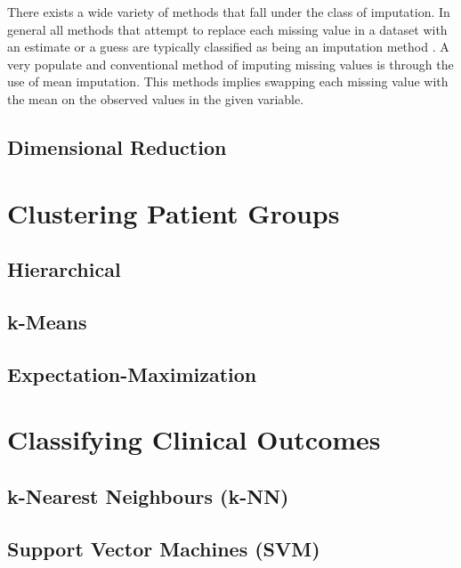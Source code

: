 \documentclass[../thesis.tex]{subfiles}
\begin{document}
\noindent There exists a wide variety of methods that fall under the class of imputation. In general all methods that attempt to replace each missing value in a dataset with an estimate or a guess are typically classified as being an imputation method \citep{allison1999missing}. A very populate and conventional method of imputing missing values is through the use of mean imputation. This methods implies swapping each missing value with the mean on the observed values in the given variable. 




\subsection{Dimensional Reduction}
\label{subsec:dim_red}

\section{Clustering Patient Groups}
\label{sec:cluster_pat_gro}

\subsection{Hierarchical}
\label{subsec:hierarchical}

\subsection{k-Means}
\label{subsec:k-means}

\subsection{Expectation-Maximization}
\label{subsec:em}

\section{Classifying Clinical Outcomes}
\label{sec:classify_clin_out}

\subsection{k-Nearest Neighbours (k-NN)}
\label{subsec:knn}

\subsection{Support Vector Machines (SVM)}
\label{subsec:svm}
\end{document}
